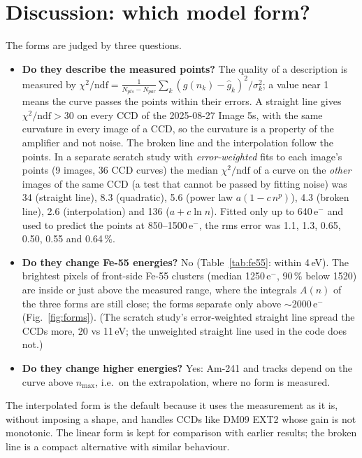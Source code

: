 \documentclass[11pt,a4paper]{article}
\newcommand{\eminus}{e$^-$}
\newcommand{\nmax}{n_{\mathrm{max}}}
\begin{document}
\section{Discussion: which model form?}
The forms are judged by three questions.
\begin{itemize}
\item \textbf{Do they describe the measured points?} The quality of a description is measured by
$\chi^2/\mathrm{ndf} = \frac{1}{N_{pts} - N_{par}}\sum_k (g(n_k) - \hat g_k)^2/\sigma_k^2$; a value near 1 means
the curve passes the points within their errors. A straight line gives $\chi^2/\mathrm{ndf} > 30$ on every
CCD of the 2025-08-27 Image 5s, with the same curvature in every image of a CCD, so the curvature is a
property of the amplifier and not noise. The broken line and the interpolation follow the points. In a
separate scratch study with \emph{error-weighted} fits to each image's points (9 images, 36 CCD curves)
the median $\chi^2/\mathrm{ndf}$ of a curve on the \emph{other} images of the same CCD (a test that cannot be
passed by fitting noise) was 34 (straight line), 8.3 (quadratic), 5.6 (power law $a(1 - c\,n^p)$), 4.3 (broken
line), 2.6 (interpolation) and 136 ($a + c\ln n$). Fitted only up to 640\,\eminus{} and used to predict the
points at 850--1500\,\eminus, the rms error was 1.1, 1.3, 0.65, 0.50, 0.55 and 0.64\,\%.
\item \textbf{Do they change Fe-55 energies?} No (Table~\ref{tab:fe55}: within 4\,eV). The brightest pixels
of front-side Fe-55 clusters (median 1250\,\eminus, 90\,\% below 1520) are inside or just above the measured
range, where the integrals $A(n)$ of the three forms are still close; the forms separate only above
$\sim$2000\,\eminus{} (Fig.~\ref{fig:forms}). (The scratch study's error-weighted straight line spread the
CCDs more, 20 vs 11\,eV; the unweighted straight line used in the code does not.)
\item \textbf{Do they change higher energies?} Yes: Am-241 and tracks depend on the curve above $\nmax$,
i.e.\ on the extrapolation, where no form is measured.
\end{itemize}
The interpolated form is the default because it uses the measurement as it is, without imposing a shape,
and handles CCDs like DM09 EXT2 whose gain is not monotonic. The linear form is kept for comparison with
earlier results; the broken line is a compact alternative with similar behaviour.

\end{document}
